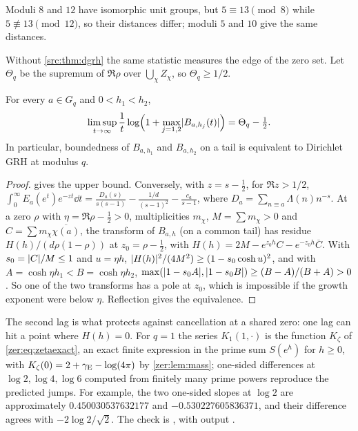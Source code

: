 Moduli $8$ and $12$ have isomorphic unit groups, but $5\equiv13\pmod8$ while $5\not\equiv13\pmod{12}$,
so their distances differ; moduli $5$ and $10$ give the same distances.

Without \cref{src:thm:dgrh} the same statistic measures the edge of the zero set. Let $\Theta_q$ be the
supremum of $\Re\rho$ over $\bigcup_\chi Z_\chi$, so $\Theta_q\ge1/2$.

\begin{theorem}\label{rec:thm:twolags}
For every $a\in G_q$ and $0<h_1<h_2$,
\[
 \limsup_{t\to\infty}\frac1t\log\Bigl(1+\max_{j=1,2}\lvert B_{a,h_j}(t)\rvert\Bigr)=\Theta_q-\tfrac12 .
\]
In particular, boundedness of $B_{a,h_1}$ and $B_{a,h_2}$ on a tail is equivalent to Dirichlet GRH
at modulus $q$.
\end{theorem}

\begin{proof}
 gives the upper bound. Conversely, with $z=s-\tfrac12$, for $\Re z>1/2$,
$\int_0^\infty E_a(e^t)e^{-zt}\dd t=\frac{D_a(s)}{s(s-1)}-\frac{1/d}{(s-1)^2}-\frac{c_a}{s-1}$, where
$D_a=\sum_{n\equiv a}\Lambda(n)n^{-s}$. At a zero $\rho$ with $\eta=\Re\rho-\tfrac12>0$, multiplicities
$m_\chi$, $M=\sum m_\chi>0$ and $C=\sum m_\chi\overline{\chi(a)}$, the transform of $B_{a,h}$ (on a common
tail) has residue $H(h)/(d\rho(1-\rho))$ at $z_0=\rho-\tfrac12$, with
$H(h)=2M-e^{z_0h}C-e^{-z_0h}\overline C$. With $s_0=\lvert C\rvert/M\le1$ and $u=\eta h$,
$\lvert H(h)\rvert^2/(4M^2)\ge(1-s_0\cosh u)^2$, and with $A=\cosh\eta h_1<B=\cosh\eta h_2$,
$\max(\lvert1-s_0A\rvert,\lvert1-s_0B\rvert)\ge(B-A)/(B+A)>0$. So one of the two transforms has a pole at $z_0$,
which is impossible if the growth exponent were below $\eta$. Reflection gives the equivalence.
\end{proof}

The second lag is what protects against cancellation at a shared zero: one lag can hit a point
where $H(h)=0$. For $q=1$ the series $K_1(1,\cdot)$ is the function $K_\zeta$ of
\eqref{zer:eq:zetaexact}, an exact finite expression in the prime sum $S(e^h)$ for $h\ge0$, with
$K_\zeta(0)=2+\gamma_{\mathrm{E}}-\log(4\pi)$ by \cref{zer:lem:mass}; one-sided differences at $\log2,\log4,\log6$ computed from finitely many prime powers
reproduce the predicted jumps. For example, the two one-sided slopes at $\log2$ are
approximately $0.450030537632177$ and $-0.530227605836371$, and their difference agrees with
$-2\log2/\sqrt2$. The check is
, with output .

